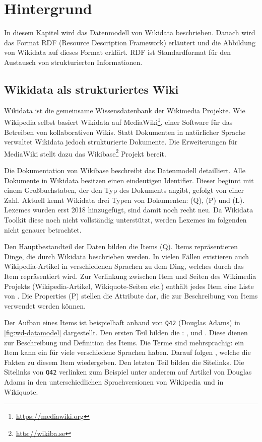 %
\chapter{Hintergrund}
\label{sec:concepts}
In diesem Kapitel wird das Datenmodell von Wikidata beschrieben.
Danach wird das Format RDF (Resource Description Framework) erläutert und die Abbildung von Wikidata auf dieses Format erklärt.
RDF ist Standardformat für den Austausch von strukturierten Informationen. 

\section{Wikidata als strukturiertes Wiki}
Wikidata ist die gemeinsame Wissensdatenbank der Wikimedia Projekte.
Wie Wikipedia selbst basiert Wikidata auf MediaWiki\footnote{\url{https://mediawiki.org}}, einer Software für das Betreiben von kollaborativen Wikis.
Statt Dokumenten in natürlicher Sprache verwaltet Wikidata jedoch strukturierte Dokumente.
Die Erweiterungen für MediaWiki stellt dazu das Wikibase\footnote{\url{htts://wikiba.se}} Projekt bereit.

Die Dokumentation von Wikibase \cite{wikibase-data-model} beschreibt das Datenmodell detailliert.
Alle Dokumente in Wikidata besitzen einen eindeutigen Identifier.
Dieser beginnt mit einem Großbuchstaben, der den Typ des Dokuments angibt, gefolgt von einer Zahl.
Aktuell kennt Wikidata drei Typen von Dokumenten:  (Q),  (P) und  (L).
Lexemes wurden erst 2018 hinzugefügt, sind damit noch recht neu.
Da Wikidata Toolkit diese noch nicht vollständig unterstützt, werden Lexemes im folgenden nicht genauer betrachtet.

Den Hauptbestandteil der Daten bilden die Items (Q).
Items repräsentieren Dinge, die durch Wikidata beschrieben werden.
In vielen Fällen existieren auch Wikipedia-Artikel in verschiedenen Sprachen zu dem Ding, welches durch das Item repräsentiert wird.
Zur Verlinkung zwischen Item und Seiten des Wikimedia Projekts (Wikipedia-Artikel, Wikiquote-Seiten etc.) enthält jedes Item eine Liste von .
Die Properties (P) stellen die Attribute dar, die zur Beschreibung von Items verwendet werden können.

Der Aufbau eines Items ist beispielhaft anhand von \verb|Q42| (Douglas Adams) in \cref{fig:wd-datamodel} dargestellt.
Den ersten Teil bilden die : ,  und .
Diese dienen zur Beschreibung und Definition des Items.
Die Terme sind mehrsprachig: ein Item kann ein  für viele verschiedene Sprachen haben.
Darauf folgen , welche die Fakten zu diesem Item wiedergeben.
Den letzten Teil bilden die Sitelinks.
Die Sitelinks von \verb|Q42| verlinken zum Beispiel unter anderem auf Artikel von Douglas Adams in den unterschiedlichen Sprachversionen von Wikipedia und in Wikiquote.

